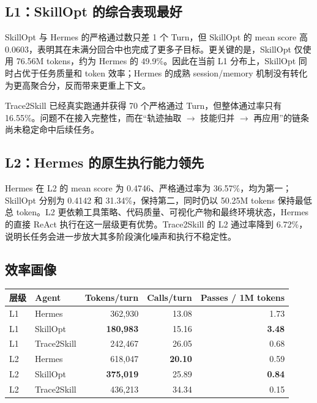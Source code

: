 \documentclass[11pt,a4paper]{article}
\begin{document}
\subsection{L1：SkillOpt 的综合表现最好}

SkillOpt 与 Hermes 的严格通过数只差 1 个 Turn，但 SkillOpt 的 mean score 高 0.0603，表明其在未满分回合中也完成了更多子目标。更关键的是，SkillOpt 仅使用 76.56M tokens，约为 Hermes 的 49.9\%。因此在当前 L1 分布上，SkillOpt 同时占优于任务质量和 token 效率；Hermes 的成熟 session/memory 机制没有转化为更高聚合分，反而带来更重上下文。

Trace2Skill 已经真实跑通并获得 70 个严格通过 Turn，但整体通过率只有 16.55\%。问题不在接入完整性，而在“轨迹抽取 $\rightarrow$ 技能归并 $\rightarrow$ 再应用”的链条尚未稳定命中后续任务。

\subsection{L2：Hermes 的原生执行能力领先}

Hermes 在 L2 的 mean score 为 0.4746、严格通过率为 36.57\%，均为第一；SkillOpt 分别为 0.4142 和 31.34\%，保持第二，同时仍以 50.25M tokens 保持最低总 token。L2 更依赖工具策略、代码质量、可视化产物和最终环境状态，Hermes 的直接 ReAct 执行在这一层级更有优势。Trace2Skill 的 L2 通过率降到 6.72\%，说明长任务会进一步放大其多阶段演化噪声和执行不稳定性。

\subsection{效率画像}

\begin{center}
\renewcommand{\arraystretch}{1.22}
\begin{tabular}{llrrr}
\toprule
层级 & Agent & Tokens/turn & Calls/turn & Passes / 1M tokens \\
\midrule
L1 & Hermes & 362,930 & 13.08 & 1.73 \\
L1 & SkillOpt & \textbf{180,983} & 15.16 & \textbf{3.48} \\
L1 & Trace2Skill & 242,467 & 26.05 & 0.68 \\
\midrule
L2 & Hermes & 618,047 & \textbf{20.10} & 0.59 \\
L2 & SkillOpt & \textbf{375,019} & 25.89 & \textbf{0.84} \\
L2 & Trace2Skill & 436,213 & 34.34 & 0.15 \\
\bottomrule
\end{tabular}
\end{center}
\end{document}
